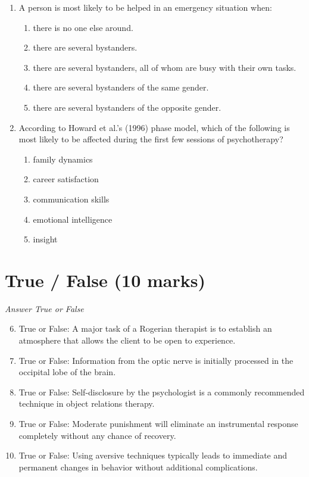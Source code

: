 \documentclass[12pt]{article}
\begin{document}
\begin{enumerate}[label=\arabic*.]
\item A person is most likely to be helped in an emergency situation when:
\begin{enumerate}[label=(\alph*)]
    \item there is no one else around.
    \item there are several bystanders.
    \item there are several bystanders, all of whom are busy with their own tasks.
    \item there are several bystanders of the same gender.
    \item there are several bystanders of the opposite gender.
\end{enumerate}
\item According to Howard et al.'s (1996) phase model, which of the following is most likely to be affected during the first few sessions of psychotherapy?
\begin{enumerate}[label=(\alph*)]
    \item family dynamics
    \item career satisfaction
    \item communication skills
    \item emotional intelligence
    \item insight
\end{enumerate}
\end{enumerate}

\section*{True / False (10 marks)}
\textit{Answer True or False}
\begin{enumerate}[label=\arabic*.]
\setcounter{enumi}{5}
\item True or False: A major task of a Rogerian therapist is to establish an atmosphere that allows the client to be open to experience.
\item True or False: Information from the optic nerve is initially processed in the occipital lobe of the brain.
\item True or False: Self-disclosure by the psychologist is a commonly recommended technique in object relations therapy.
\item True or False: Moderate punishment will eliminate an instrumental response completely without any chance of recovery.
\item True or False: Using aversive techniques typically leads to immediate and permanent changes in behavior without additional complications.
\end{enumerate}
\end{document}

